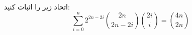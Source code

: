     \p
     اتحاد زیر را اثبات کنید:
    $$\sum\limits_{i=0}^{n} 2^{2n-2i} \binom{2n}{2n-2i} \binom{2i}{i} = \binom{4n}{2n}$$
        